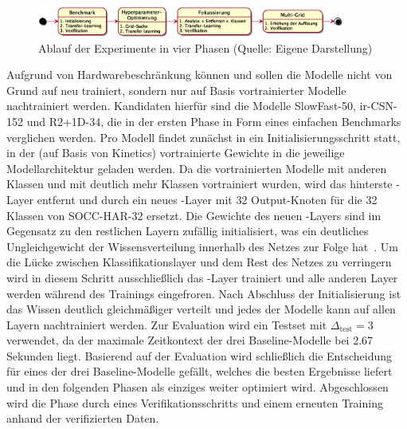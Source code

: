 \begin{figure}[htbp!]
    \centering
    \includegraphics[width=0.9\textwidth, height=0.8\textwidth, keepaspectratio, interpolate]{fig/phases.eps}
    \caption[Ablauf der Experimente]{Ablauf der Experimente in vier Phasen (Quelle: Eigene Darstellung)}
    \label{fig:phases}
\end{figure}

Aufgrund von Hardwarebeschränkung können und sollen die Modelle nicht von Grund auf neu trainiert, sondern nur auf Basis vortrainierter Modelle nachtrainiert werden.
Kandidaten hierfür sind die Modelle SlowFast-50, ir-CSN-152 und R2+1D-34, die in der ersten Phase in Form eines einfachen Benchmarks verglichen werden.
Pro Modell findet zunächst in ein Initialisierungsschritt statt, in der (auf Basis von Kinetics) vortrainierte Gewichte in die jeweilige Modellarchitektur geladen werden.
Da die vortrainierten Modelle mit anderen Klassen und mit deutlich mehr Klassen vortrainiert wurden, wird das hinterste \fc-Layer entfernt und durch ein neues \fc-Layer mit 32 Output-Knoten für die 32 Klassen von SOCC-HAR-32 ersetzt.
Die Gewichte des neuen \fc-Layers sind im Gegensatz zu den restlichen Layern zufällig initialisiert, was ein deutliches Ungleichgewicht der Wissensverteilung innerhalb des Netzes zur Folge hat~\cite{Gugger20}.
Um die Lücke zwischen Klassifikationslayer und dem Rest des Netzes zu verringern wird in diesem Schritt ausschließlich das \fc-Layer trainiert und alle anderen Layer werden während des Trainings eingefroren.
Nach Abschluss der Initialisierung ist das Wissen deutlich gleichmäßiger verteilt und jedes der Modelle kann auf allen Layern nachtrainiert werden.
Zur Evaluation wird ein Testset mit $\Delta_\text{test}=3$ verwendet, da der maximale Zeitkontext der drei Baseline-Modelle bei 2.67 Sekunden liegt.
Basierend auf der Evaluation wird schließlich die Entscheidung für eines der drei Baseline-Modelle gefällt, welches die besten Ergebnisse liefert und in den folgenden Phasen als einziges weiter optimiert wird.
Abgeschlossen wird die Phase durch eines Verifikationsschritts und einem erneuten Training anhand der verifizierten Daten.

